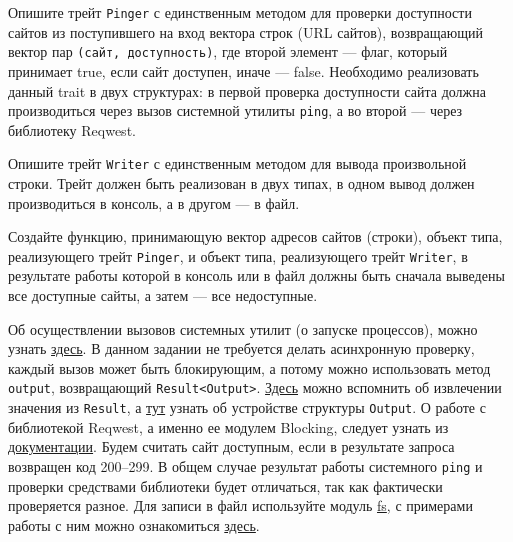 \documentclass[a4paper, 10pt]{extarticle}
\begin{document}
\begin{tsk}
    Опишите трейт \verb|Pinger| с единственным методом для проверки доступности сайтов из поступившего на вход вектора строк (URL сайтов), возвращающий вектор пар \verb|(сайт, доступность)|, где второй элемент --- флаг, который принимает true, если сайт доступен, иначе --- false. Необходимо реализовать данный trait в двух структурах: в первой проверка доступности сайта должна производиться через вызов системной утилиты \verb|ping|, а во второй --- через библиотеку Reqwest.

    Опишите трейт \verb|Writer| с единственным методом для вывода произвольной строки. Трейт должен быть реализован в двух типах, в одном вывод должен производиться в консоль, а в другом --- в файл.

    Создайте функцию, принимающую вектор адресов сайтов (строки), объект типа, реализующего трейт \verb|Pinger|, и объект типа, реализующего трейт \verb|Writer|, в результате работы которой в консоль или в файл должны быть сначала выведены все доступные сайты, а затем --- все недоступные.

    Об осуществлении вызовов системных утилит (о запуске процессов), можно узнать \href{https://doc.rust-lang.org/std/process/struct.Command.html}{здесь}. В данном задании не требуется делать асинхронную проверку, каждый вызов может быть блокирующим, а потому можно использовать метод \verb|output|, возвращающий \verb|Result<Output>|. \href{https://doc.rust-lang.org/std/io/type.Result.html}{Здесь} можно вспомнить об извлечении значения из \verb|Result|, а \href{https://doc.rust-lang.org/std/process/struct.Output.html}{тут} узнать об устройстве структуры \verb|Output|. О работе с библиотекой Reqwest, а именно ее модулем Blocking, следует узнать из \href{https://docs.rs/reqwest/latest/reqwest/blocking/index.html}{документации}. Будем считать сайт доступным, если в результате запроса возвращен код 200--299. В общем случае результат работы системного \verb|ping| и проверки средствами библиотеки будет отличаться, так как фактически проверяется разное. Для записи в файл используйте модуль \href{https://doc.rust-lang.org/std/fs/index.html}{fs}, с примерами работы с ним можно ознакомиться \href{https://metanit.com/rust/tutorial/14.2.php}{здесь}.
\end{tsk}
\end{document}
